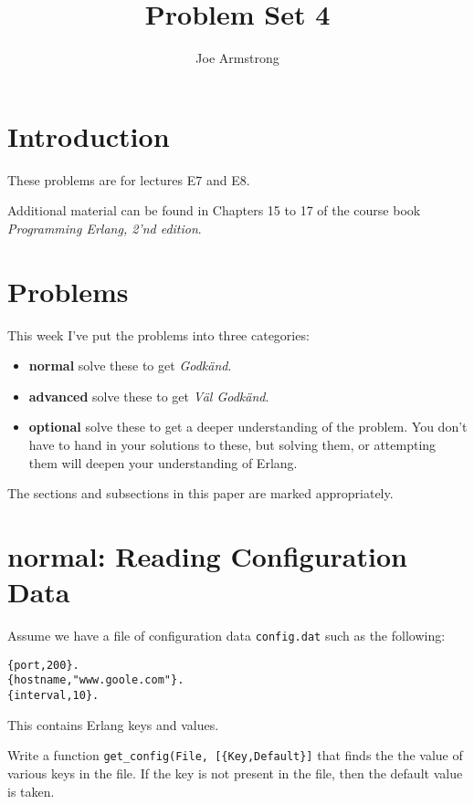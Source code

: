\documentclass[12pt]{hitec}
\title{Problem Set 4}
\author{Joe Armstrong}
\begin{document}
\maketitle

\tableofcontents

\section{Introduction}
These problems are for lectures E7 and E8.

Additional material can be found in Chapters 15 to 17 of the course book
{\sl Programming Erlang, 2'nd edition}.

\section{Problems}

This week I've put the problems into three categories:

\begin{itemize}
\item {\bf normal} solve these to get {\sl Godk\"{a}nd}.
\item {\bf advanced} solve these to get {\sl V\"{a}l Godk\"{a}nd}.
\item {\bf optional} solve these to get a deeper understanding of the problem. You don't
have to hand in your solutions to these, but solving them, or attempting them will
deepen your understanding of Erlang.
\end{itemize}

The sections and subsections in this paper are marked appropriately.

\section{normal: Reading Configuration Data}

Assume we have a file of configuration data \verb+config.dat+ such as the following:

\begin{Verbatim}[frame=single]
{port,200}.
{hostname,"www.goole.com"}.
{interval,10}.
\end{Verbatim}

This contains Erlang keys and values.

Write a function \verb+get_config(File, [{Key,Default}]+ that finds the
the value of various keys in the file. If the key is not present in the file,
then the default value is taken.
\end{document}
